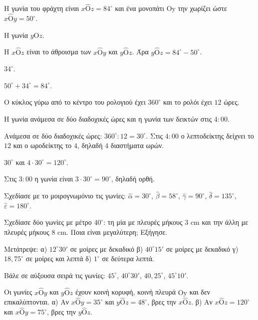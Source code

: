\tixero Η γωνία του φράχτη είναι $x\hat{\mathrm{Ο}}z=84^\circ$ και ένα μονοπάτι $\mathrm{Οy}$ την χωρίζει ώστε $x\hat{\mathrm{Ο}}y=50^\circ$.\par
\tithelo Η γωνία $y\hat{\mathrm{Ο}}z$.\par
\possindeo Η $x\hat{\mathrm{Ο}}z$ είναι το άθροισμα των $x\hat{\mathrm{Ο}}y$ και $y\hat{\mathrm{Ο}}z$. Άρα $y\hat{\mathrm{Ο}}z=84^\circ-50^\circ$.\par
\apantisi $34^\circ$.\par
\elegxos $50^\circ+34^\circ=84^\circ$.

\tixero Ο κύκλος γύρω από το κέντρο του ρολογιού έχει $360^\circ$ και το ρολόι έχει $12$ ώρες.\par
\tithelo Η γωνία ανάμεσα σε δύο διαδοχικές ώρες και η γωνία των δεικτών στις $4{:}00$.\par
\possindeo Ανάμεσα σε δύο διαδοχικές ώρες: $360^\circ:12=30^\circ$. Στις $4{:}00$ ο λεπτοδείκτης δείχνει το $12$ και ο ωροδείκτης το $4$, δηλαδή $4$ διαστήματα ωρών.\par
\apantisi $30^\circ$ και $4\cdot30^\circ=120^\circ$.\par
\elegxos Στις $3{:}00$ η γωνία είναι $3\cdot30^\circ=90^\circ$, δηλαδή ορθή.



\ex Σχεδίασε με το μοιρογνωμόνιο τις γωνίες: $\hat{\alpha}=30^\circ$, $\hat{\beta}=58^\circ$, $\hat{\gamma}=90^\circ$, $\hat{\delta}=135^\circ$, $\hat{\varepsilon}=180^\circ$.

\ex Σχεδίασε δύο γωνίες με μέτρο $40^\circ$: τη μία με πλευρές μήκους $3$ cm και την άλλη με πλευρές μήκους $8$ cm. Ποια είναι μεγαλύτερη; Εξήγησε.

\ex Μετάτρεψε: α) $12^\circ30'$ σε μοίρες με δεκαδικό \quad β) $40^\circ15'$ σε μοίρες με δεκαδικό \quad γ) $18{,}75^\circ$ σε μοίρες και λεπτά \quad δ) $1^\circ$ σε δεύτερα λεπτά.

\ex Βάλε σε αύξουσα σειρά τις γωνίες: $45^\circ$, $40^\circ30'$, $40{,}25^\circ$, $45^\circ10'$.

\ex Οι γωνίες $x\hat{\mathrm{Ο}}y$ και $y\hat{\mathrm{Ο}}z$ έχουν κοινή κορυφή, κοινή πλευρά $\mathrm{Οy}$ και δεν επικαλύπτονται. α) Αν $x\hat{\mathrm{Ο}}y=35^\circ$ και $y\hat{\mathrm{Ο}}z=48^\circ$, βρες την $x\hat{\mathrm{Ο}}z$. β) Αν $x\hat{\mathrm{Ο}}z=120^\circ$ και $x\hat{\mathrm{Ο}}y=75^\circ$, βρες την $y\hat{\mathrm{Ο}}z$.

